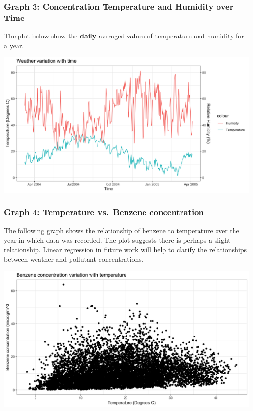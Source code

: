 \documentclass[]{article}
\begin{document}
\hypertarget{graph-3-concentration-temperature-and-humidity-over-time}{%
\subsubsection{Graph 3: Concentration Temperature and Humidity over
Time}\label{graph-3-concentration-temperature-and-humidity-over-time}}

The plot below show the \textbf{daily} averaged values of temperature
and humidity for a year.

\includegraphics{../Images/weathervstime.png}

\hypertarget{graph-4-temperature-vs.benzene-concentration}{%
\subsubsection{Graph 4: Temperature vs.~Benzene
concentration}\label{graph-4-temperature-vs.benzene-concentration}}

The following graph shows the relationship of benzene to temperature
over the year in which data was recorded. The plot suggests there is
perhaps a slight relationship. Linear regression in future work will
help to clarify the relationships between weather and pollutant
concentrations.

\includegraphics{../Images/tempvsbenzene.png}
\end{document}
